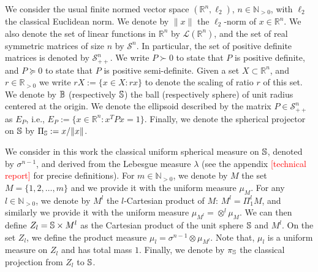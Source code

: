 We consider the usual finite normed vector space $(\mathbb{R}^n,\ell_2)$, $n \in \mathbb{N}_{> 0}$, with $\ell_2$ the classical Euclidean norm. We denote by $\lVert x \rVert$ the $\ell_2$-norm of $x \in \mathbb{R}^n$. We also denote the set of linear functions in $\mathbb{R}^n$ by $\mathcal{L}(\mathbb{R}^n)$, and the set of real symmetric matrices of size $n$ by $\mathcal{S}^n$. In particular, the set of positive definite matrices is denoted by $\mathcal{S}^n_{++}$. We write $P \succ 0$ to state that $P$ is positive definite, and $P \succeq 0$ to state that $P$ is positive semi-definite. Given a set $X \subset \mathbb{R}^n$, and $r \in \mathbb{R}_{> 0}$ we write \mbox{$rX := \{x \in X : rx\}$} to denote the scaling of ratio $r$ of this set. We denote by $\mathbb{B}$ (respectively $\mathbb{S}$) the ball (respectively sphere) of unit radius centered at the origin.  We denote the ellipsoid described by the matrix $P \in \mathcal{S}^n_{++}$ as $E_P$, i.e., $E_P:= \{x \in \mathbb{R}^n: x^T P x = 1\}$. Finally, we denote the spherical projector on $\mathbb{S}$ by $\Pi_{\mathbb{S}} := x/\Vert x\Vert$. 
 
We consider in this work the classical uniform spherical measure on $\mathbb{S}$, denoted by $\sigma^{n-1}$, and derived from the Lebesgue measure $\lambda$ (see the appendix \textcolor{red}{[technical report]} for precise definitions). For $m \in \mathbb{N}_{>0}$, we denote by $M$ the set $M=\{1,2, \dots,m \}$ and we provide it with the uniform measure $\mu_M$. For any $l \in \mathbb{N}_{>0}$, we denote by $M^l$ the $l$-Cartesian product of $M$: $M^l = \Pi_1^l M$, and similarly we provide it with the uniform measure $\mu_{M^l} = \otimes^l \mu_M$. We can then define $Z_l = \mathbb{S} \times M^l$ as the Cartesian product of the unit sphere $\mathbb{S}$ and $M^l$. On the set $Z_l$, we define the product measure $\mu_l = \sigma^{n-1} \otimes \mu_{M^l}$. Note that, $\mu_l$ is a uniform measure on $Z_l$ and has total mass $1$. Finally, we denote by $\pi_{\mathbb{S}}$ the classical projection from $Z_l$ to $\mathbb{S}$.

